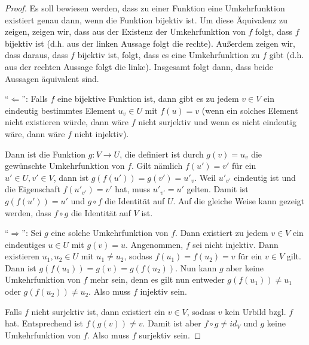 \documentclass[../../main.tex]{subfiles}
\begin{document}
\begin{proof}
    \label{proof:existenceOfInverseMap}
    Es soll bewiesen werden, dass zu einer Funktion eine Umkehrfunktion existiert genau dann, wenn die Funktion bijektiv ist. Um diese Äquivalenz zu zeigen, zeigen wir, dass aus der Existenz der Umkehrfunktion von $f$ folgt, dass $f$ bijektiv ist (d.h. aus der linken Aussage folgt die rechte). Außerdem zeigen wir, dass daraus, dass $f$ bijektiv ist, folgt, dass es eine Umkehrfunktion zu $f$ gibt (d.h. aus der rechten Aussage folgt die linke). Insgesamt folgt dann, dass beide Aussagen äquivalent sind.
    
    \enquote{$\Leftarrow$}:
    Falls $f$ eine bijektive Funktion ist, dann gibt es zu jedem $v\in V$ ein eindeutig bestimmtes Element $u_v\in U$ mit $f(u)=v$ (wenn ein solches Element nicht existieren würde, dann wäre $f$ nicht surjektiv und wenn es nicht eindeutig wäre, dann wäre $f$ nicht injektiv). 
    
    Dann ist die Funktion $g\colon V\rightarrow U$, die definiert ist durch $g(v)=u_v$ die gewünschte Umkehrfunktion von $f$. Gilt nämlich $f(u')=v'$ für ein $u'\in U,v'\in V$, dann ist $g(f(u'))=g(v')=u'_v$. Weil $u'_{v'}$ eindeutig ist und die Eigenschaft $f(u'_{v'})=v'$ hat, muss $u'_{v'}=u'$ gelten. Damit ist $g(f(u'))=u'$ und $g\circ f$ die Identität auf $U$. Auf die gleiche Weise kann gezeigt werden, dass $f\circ g$ die Identität auf $V$ ist.
    
    \enquote{$\Rightarrow$}:
    Sei $g$ eine solche Umkehrfunktion von $f$. Dann existiert zu jedem $v\in V$ ein eindeutiges $u\in U$ mit $g(v)=u$. Angenommen, $f$ sei nicht injektiv. Dann existieren $u_1,u_2\in U$ mit $u_1\neq u_2$, sodass $f(u_1)=f(u_2)=v$ für ein $v\in V$ gilt. Dann ist $g(f(u_1))=g(v)=g(f(u_2))$. Nun kann $g$ aber keine Umkehrfunktion von $f$ mehr sein, denn es gilt nun entweder $g(f(u_1))\neq u_1$ oder $g(f(u_2))\neq u_2$. Also muss $f$ injektiv sein.
    
    Falls $f$ nicht surjektiv ist, dann existiert ein $v\in V$, sodass $v$ kein Urbild bzgl. $f$ hat. Entsprechend ist $f(g(v))\neq v$. Damit ist aber $f\circ g\neq id_V$ und $g$ keine Umkehrfunktion von $f$. Also muss $f$ surjektiv sein.
\end{proof}

\newpage
\pagecolor{white}
\end{document}
